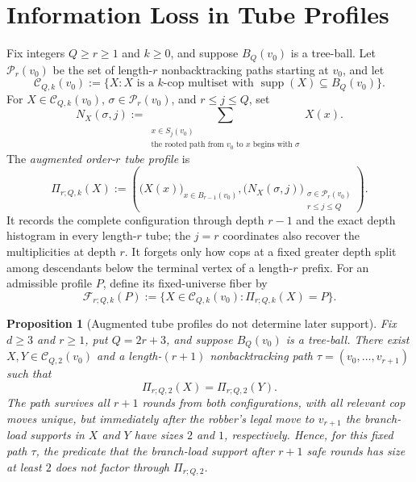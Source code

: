 \documentclass[11pt]{amsart}
\newtheorem{proposition}[theorem]{Proposition}
\theoremstyle{definition}
\DeclareMathOperator{\supp}{supp}
\begin{document}
\section{Information Loss in Tube Profiles}
\label{sec:profile-loss}

Fix integers $Q\geq r\geq1$ and $k\geq0$, and suppose $B_Q(v_0)$ is a tree-ball. Let $\mathcal P_r(v_0)$ be the set of length-$r$ nonbacktracking paths starting at $v_0$, and let
\[
\mathcal C_{Q,k}(v_0)
:=\{X: X\text{ is a $k$-cop multiset with }\supp(X)\subseteq B_Q(v_0)\}.
\]
For $X\in\mathcal C_{Q,k}(v_0)$, $\sigma\in\mathcal P_r(v_0)$, and $r\leq j\leq Q$, set
\[
N_X(\sigma,j)
:=\sum_{\substack{x\in S_j(v_0)\\
\text{the rooted path from $v_0$ to $x$ begins with }\sigma}}X(x).
\]
The \emph{augmented order-$r$ tube profile} is
\[
\Pi_{r;Q,k}(X)
:=\left(
\bigl(X(x)\bigr)_{x\in B_{r-1}(v_0)},
\bigl(N_X(\sigma,j)\bigr)_{\substack{\sigma\in\mathcal P_r(v_0)\\ r\leq j\leq Q}}
\right).
\]
It records the complete configuration through depth $r-1$ and the exact depth histogram in every length-$r$ tube; the $j=r$ coordinates also recover the multiplicities at depth $r$. It forgets only how cops at a fixed greater depth split among descendants below the terminal vertex of a length-$r$ prefix. For an admissible profile $P$, define its fixed-universe fiber by
\[
\mathcal F_{r;Q,k}(P)
:=\{X\in\mathcal C_{Q,k}(v_0):\Pi_{r;Q,k}(X)=P\}.
\]

\begin{proposition}[Augmented tube profiles do not determine later support]
\label{prop:profile-nondeterminacy}
Fix $d\geq3$ and $r\geq1$, put $Q=2r+3$, and suppose $B_Q(v_0)$ is a tree-ball. There exist $X,Y\in\mathcal C_{Q,2}(v_0)$ and a length-$(r+1)$ nonbacktracking path $\tau=(v_0,\ldots,v_{r+1})$ such that
\[
\Pi_{r;Q,2}(X)=\Pi_{r;Q,2}(Y).
\]
The path survives all $r+1$ rounds from both configurations, with all relevant cop moves unique, but immediately after the robber's legal move to $v_{r+1}$ the branch-load supports in $X$ and $Y$ have sizes $2$ and $1$, respectively. Hence, for this fixed path $\tau$, the predicate that the branch-load support after $r+1$ safe rounds has size at least $2$ does not factor through $\Pi_{r;Q,2}$.
\end{proposition}
\end{document}
